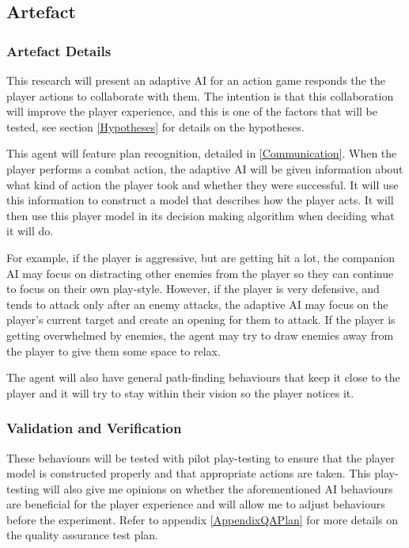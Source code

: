 \documentclass{IEEEtran}
\begin{document}
\subsection{Artefact}
\label{Artefact}

\subsubsection{Artefact Details}
\label{ArtefactDetails}

This research will present an adaptive AI for an action game responds the the player actions to collaborate with them. The intention is that this collaboration will improve the player experience, and this is one of the factors that will be tested, see section \ref{Hypotheses} for details on the hypotheses.

This agent will feature plan recognition, detailed in \ref{Communication}. When the player performs a combat action, the adaptive AI will be given information about what kind of action the player took and whether they were successful. It will use this information to construct a model that describes how the player acts. It will then use this player model in its decision making algorithm when deciding what it will do.

For example, if the player is aggressive, but are getting hit a lot, the companion AI may focus on distracting other enemies from the player so they can continue to focus on their own play-style. However, if the player is very defensive, and tends to attack only after an enemy attacks, the adaptive AI may focus on the player's current target and create an opening for them to attack. If the player is getting overwhelmed by enemies, the agent may try to draw enemies away from the player to give them some space to relax.

The agent will also have general path-finding behaviours that keep it close to the player and it will try to stay within their vision so the player notices it.

\subsubsection{Validation and Verification}
\label{Validation}

These behaviours will be tested with pilot play-testing to ensure that the player model is constructed properly and that appropriate actions are taken. This play-testing will also give me opinions on whether the aforementioned AI behaviours are beneficial for the player experience and will allow me to adjust behaviours before the experiment. Refer to appendix \ref{AppendixQAPlan} for more details on the quality assurance test plan.
\end{document}

